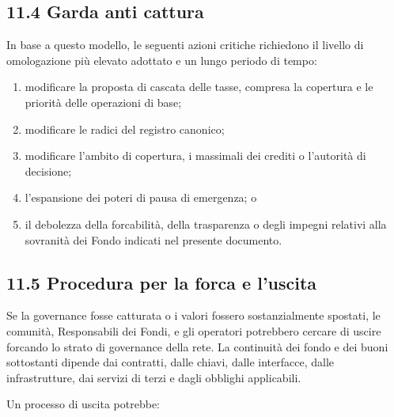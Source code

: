 \documentclass[11pt]{article}
\begin{document}
\subsection*{11.4 Garda anti cattura}

In base a questo modello, le seguenti azioni critiche richiedono il livello di omologazione più elevato adottato e un lungo periodo di tempo:

\begin{enumerate}[leftmargin=*]
\item modificare la proposta di cascata delle tasse, compresa la copertura e le priorità delle operazioni di base;
\item modificare le radici del registro canonico;
\item modificare l'ambito di copertura, i massimali dei crediti o l'autorità di decisione;
\item l'espansione dei poteri di pausa di emergenza; o
\item il debolezza della forcabilità, della trasparenza o degli impegni relativi alla sovranità dei Fondo indicati nel presente documento.
\end{enumerate}
\subsection*{11.5 Procedura per la forca e l'uscita}

Se la governance fosse catturata o i valori fossero sostanzialmente spostati, le comunità, Responsabili dei Fondi, e gli operatori potrebbero cercare di uscire forcando lo strato di governance della rete. La continuità dei fondo e dei buoni sottostanti dipende dai contratti, dalle chiavi, dalle interfacce, dalle infrastrutture, dai servizi di terzi e dagli obblighi applicabili.

Un processo di uscita potrebbe:
\end{document}
